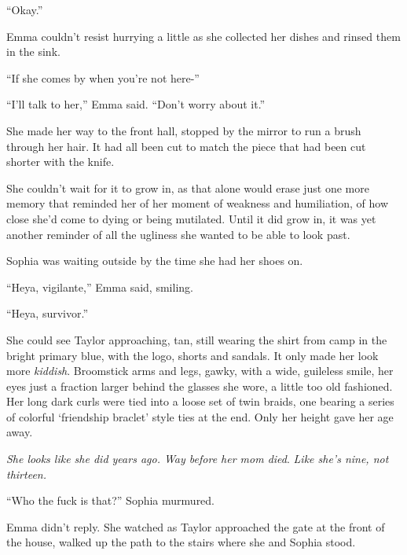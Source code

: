 ``Okay.''



Emma couldn't resist hurrying a little as she collected her dishes and rinsed them in the sink.



``If she comes by when you're not here-''



``I'll talk to her,'' Emma said.  ``Don't worry about it.''



She made her way to the front hall, stopped by the mirror to run a brush through her hair.  It had all been cut to match the piece that had been cut shorter with the knife.



She couldn't wait for it to grow in, as that alone would erase just one more memory that reminded her of her moment of weakness and humiliation, of how close she'd come to dying or being mutilated.  Until it did grow in, it was yet another reminder of all the ugliness she wanted to be able to look past.



Sophia was waiting outside by the time she had her shoes on.



``Heya, vigilante,'' Emma said, smiling.



``Heya, survivor.''



She could see Taylor approaching, tan, still wearing the shirt from camp in the bright primary blue, with the logo, shorts and sandals.  It only made her look more \emph{kiddish}.  Broomstick arms and legs, gawky, with a wide, guileless smile, her eyes just a fraction larger behind the glasses she wore, a little too old fashioned.  Her long dark curls were tied into a loose set of twin braids, one bearing a series of colorful `friendship braclet' style ties at the end.  Only her height gave her age away.



\emph{She looks like she did years ago.  Way before her mom died}.  \emph{Like she's nine, not thirteen.}



``Who the fuck is that?'' Sophia murmured.



Emma didn't reply.  She watched as Taylor approached the gate at the front of the house, walked up the path to the stairs where she and Sophia stood.



